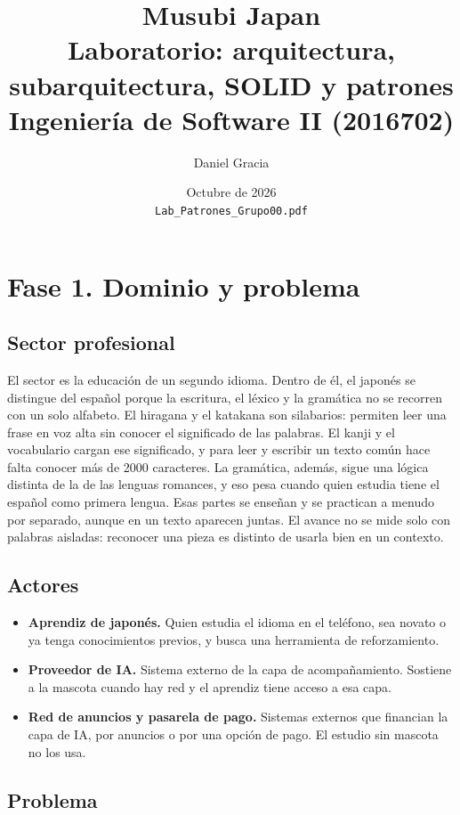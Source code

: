 \documentclass[11pt]{article}
\title{Musubi Japan\\[0.35em]
\large Laboratorio: arquitectura, subarquitectura, SOLID y patrones\\[0.25em]
\normalsize Ingeniería de Software II (2016702)}
\author{Daniel Gracia}
\date{Octubre de 2026\\[0.35em]
\normalsize\texttt{Lab\_Patrones\_Grupo00.pdf}}
\begin{document}
\maketitle
\vspace{-1.6em}

\section{Fase 1. Dominio y problema}

\subsection{Sector profesional}

El sector es la educación de un segundo idioma. Dentro de él, el japonés se distingue del español porque la escritura, el léxico y la gramática no se recorren con un solo alfabeto. El hiragana y el katakana son silabarios: permiten leer una frase en voz alta sin conocer el significado de las palabras. El kanji y el vocabulario cargan ese significado, y para leer y escribir un texto común hace falta conocer más de 2000 caracteres. La gramática, además, sigue una lógica distinta de la de las lenguas romances, y eso pesa cuando quien estudia tiene el español como primera lengua. Esas partes se enseñan y se practican a menudo por separado, aunque en un texto aparecen juntas. El avance no se mide solo con palabras aisladas: reconocer una pieza es distinto de usarla bien en un contexto.

\subsection{Actores}

\begin{itemize}
  \raggedright
  \item \textbf{Aprendiz de japonés.} Quien estudia el idioma en el teléfono, sea novato o ya tenga conocimientos previos, y busca una herramienta de reforzamiento.
  \item \textbf{Proveedor de IA.} Sistema externo de la capa de acompañamiento. Sostiene a la mascota cuando hay red y el aprendiz tiene acceso a esa capa.
  \item \textbf{Red de anuncios y pasarela de pago.} Sistemas externos que financian la capa de IA, por anuncios o por una opción de pago. El estudio sin mascota no los usa.
\end{itemize}

\subsection{Problema}
\end{document}
